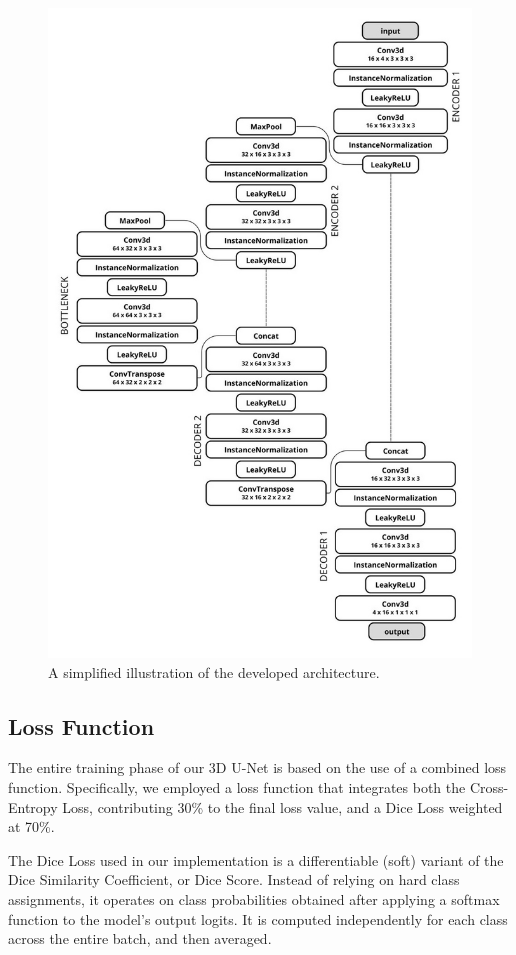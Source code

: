 \documentclass[10pt,twocolumn,letterpaper]{article}
\begin{document}
\begin{figure}
    \centering
    \includegraphics[width=0.8\linewidth]{img/architect.jpeg}
    \caption{A simplified illustration of the developed architecture.}
\end{figure}


\subsection{Loss Function} \label{loss_function}
The entire training phase of our 3D U-Net is based on the use of a combined loss function. Specifically, we employed a loss function that integrates both the Cross-Entropy Loss, contributing 30\% to the final loss value, and a Dice Loss weighted at 70\%.

The Dice Loss used in our implementation is a differentiable (soft) variant of the Dice Similarity Coefficient, or Dice Score. Instead of relying on hard class assignments, it operates on class probabilities obtained after applying a softmax function to the model’s output logits. It is computed independently for each class across the entire batch, and then averaged.
\end{document}
